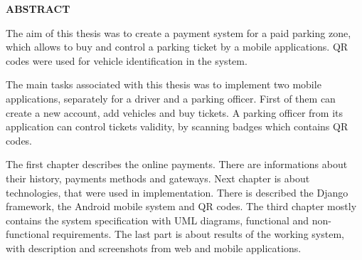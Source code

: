 
\vspace*{\fill}

\begin{center}
	{\large \textbf{ABSTRACT}}
\end{center}

\vspace{1cm}

The aim of this thesis was to create a payment system for a paid parking zone, which allows to buy and control a parking ticket by a mobile applications. QR codes were used for vehicle identification in the system.

The main tasks associated with this thesis was to implement two mobile applications, separately for a driver and a parking officer. First of them can create a new account, add vehicles and buy tickets. A parking officer from its application can control tickets validity, by scanning badges which contains QR codes.

The first chapter describes the online payments. There are informations about their history, payments methods and gateways. Next chapter is about technologies, that were used in implementation. There is described the Django framework, the Android mobile system and QR codes. The third chapter mostly contains the system specification with UML diagrams, functional and non-functional requirements. The last part is about results of the working system, with description and screenshots from web and mobile applications.

\vspace*{\fill}